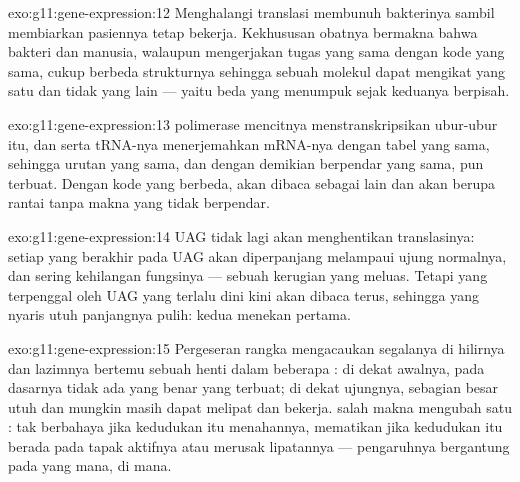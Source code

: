 \begin{solution}{exo:g11:gene-expression:12}
Menghalangi translasi membunuh bakterinya sambil membiarkan 
pasiennya tetap bekerja. Kekhususan obatnya bermakna bahwa 
bakteri dan  manusia, walaupun mengerjakan tugas yang sama
dengan kode yang sama, cukup berbeda strukturnya sehingga sebuah
molekul dapat mengikat yang satu dan tidak yang lain --- yaitu beda
yang menumpuk sejak keduanya berpisah.
\end{solution}

\begin{solution}{exo:g11:gene-expression:13}
 polimerase mencitnya menstranskripsikan  ubur-ubur itu, dan
 serta tRNA-nya menerjemahkan mRNA-nya dengan tabel  yang
sama, sehingga urutan  yang sama, dan dengan demikian 
berpendar yang sama, pun terbuat. Dengan kode yang berbeda, 
akan dibaca sebagai  lain dan  akan berupa rantai
tanpa makna yang tidak berpendar.
\end{solution}

\begin{solution}{exo:g11:gene-expression:14}
UAG tidak lagi akan menghentikan translasinya: setiap  yang
 berakhir pada UAG akan diperpanjang melampaui ujung normalnya,
dan sering kehilangan fungsinya --- sebuah kerugian yang meluas. Tetapi
 yang terpenggal oleh UAG yang terlalu dini kini akan dibaca terus,
sehingga  yang nyaris utuh panjangnya pulih:  kedua
menekan  pertama.
\end{solution}

\begin{solution}{exo:g11:gene-expression:15}
Pergeseran rangka mengacaukan segalanya di hilirnya dan lazimnya
bertemu sebuah henti dalam beberapa : di dekat awalnya, pada
dasarnya tidak ada  yang benar yang terbuat; di dekat ujungnya,
sebagian besar  utuh dan mungkin masih dapat melipat dan
bekerja.  salah makna mengubah satu : tak berbahaya
jika kedudukan itu menahannya, mematikan jika kedudukan itu berada pada
tapak aktifnya atau merusak lipatannya --- pengaruhnya bergantung pada
 yang mana, di mana.
\end{solution}

